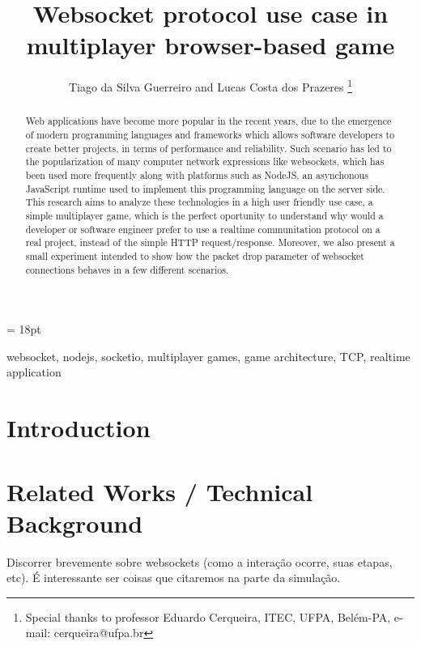 \documentclass[english]{sbrt}
\begin{document}
\title{Websocket protocol use case in multiplayer browser-based game}

\author{Tiago da Silva Guerreiro and Lucas Costa dos Prazeres
  \thanks{Special thanks to professor Eduardo Cerqueira, ITEC, UFPA, Belém-PA, e-mail: cerqueira@ufpa.br}
}

\maketitle

\baselineskip = 18pt


\begin{abstract}
  Web applications have become more popular in the recent years, due to the emergence of modern programming languages and frameworks which allows software developers to create better projects, in terms of performance and reliability.
Such scenario has led to the popularization of many computer network expressions like websockets, which has been used more frequently along with platforms such as NodeJS, an asynchonous JavaScript runtime used to implement this programming language
on the server side. This research aims to analyze these technologies in a high user friendly use case, a simple multiplayer game, which is the perfect oportunity to understand why would a developer or software engineer prefer to use a realtime communitation
protocol on a real project, instead of the simple HTTP request/response. Moreover, we also present a small experiment intended to show how the packet drop parameter of websocket connections behaves in a few different scenarios.

\end{abstract}
\begin{keywords}
  websocket, nodejs, socketio, multiplayer games, game architecture, TCP, realtime application
\end{keywords}

\section{\textbf{Introduction}}

\section{\textbf{Related Works / Technical Background}}
Discorrer brevemente sobre websockets (como a interação ocorre, suas etapas, etc). É interessante ser coisas que citaremos na parte da simulação.
\end{document}
